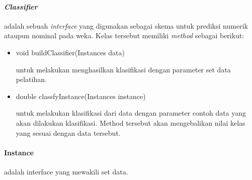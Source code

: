 \paragraph{\textsl{Classifier}} adalah sebuah \textsl{interface} yang digunakan sebagai skema untuk prediksi numerik ataupun nominal pada weka. Kelas tersebut memiliki \textsl{method} sebagai berikut:
\begin{itemize}
	
	\item void buildClassifier(Instances data)
	
	untuk melakukan menghasilkan klasifikasi dengan parameter set data pelatihan.
	
	\item double classfyInstance(Instances instance)
	
	untuk melakukan klasifikasi dari data dengan parameter contoh data yang akan dilakukan klasifikasi. Method tersebut akan mengebalikan nilai kelas yang sesuai dengan data tersebut.
	
\end{itemize}

\paragraph{Instance} adalah interface yang mewakili set data.


